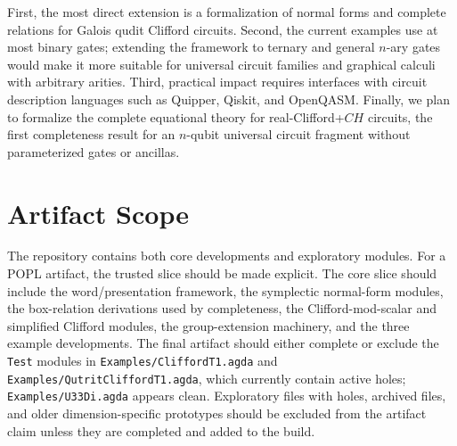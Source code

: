 \documentclass[acmsmall,screen,review,anonymous]{acmart}
\newcommand{\code}[1]{\texttt{#1}}
\begin{document}
First, the most direct extension is a formalization of normal forms and complete
relations for Galois qudit Clifford circuits. Second, the current examples use
at most binary gates; extending the framework to ternary and general \(n\)-ary
gates would make it more suitable for universal circuit families and graphical
calculi with arbitrary arities. Third, practical impact requires interfaces with
circuit description languages such as Quipper, Qiskit, and OpenQASM. Finally,
we plan to formalize the complete equational theory for real-Clifford+\(CH\)
circuits, the first completeness result for an \(n\)-qubit universal circuit
fragment without parameterized gates or ancillas.

\section{Artifact Scope}
\label{sec:artifact}

The repository contains both core developments and exploratory modules. For a
POPL artifact, the trusted slice should be made explicit. The core slice should
include the word/presentation framework, the symplectic normal-form modules, the
box-relation derivations used by completeness, the Clifford-mod-scalar and
simplified Clifford modules, the group-extension machinery, and the three
example developments. The final artifact should either complete or exclude the
\code{Test} modules in \code{Examples/CliffordT1.agda} and
\code{Examples/QutritCliffordT1.agda}, which currently contain active holes;
\code{Examples/U33Di.agda} appears clean. Exploratory files with holes,
archived files, and older dimension-specific prototypes should be excluded from
the artifact claim unless they are completed and added to the build.



\end{document}
